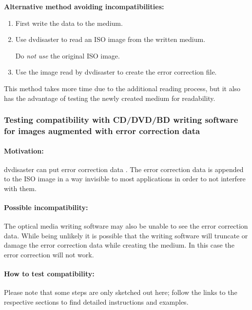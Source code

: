 \newpage

{\bf Alternative method avoiding incompatibilities:}

\begin{enumerate}
\item First write the data to the medium.
\item Use dvdisaster to read an ISO image from the written medium.

Do {\em not use} the original ISO image.
\item Use the  image read by dvdisaster to create the error correction file.
\end{enumerate}

This method takes more time due to the additional reading process, but 
it also has the advantage of testing the newly created medium for readability. 

\newpage
\subsubsection{Testing compatibility with CD/DVD/BD writing software for images augmented with error correction data}
\label{howto-compat-augment}

\paragraph{Motivation:} dvdisaster can put error correction 
data . The error 
correction data is appended to the ISO image in a way invisible to most applications 
in order to not interfere with them.

\paragraph{Possible incompatibility:} The optical media writing software 
may also be unable to see the error correction data. While being unlikely 
it is possible that the writing software will truncate or damage the error 
correction data while creating the medium. In this case the error correction will not work.

\paragraph{How to test compatibility:} Please note that some steps are only sketched out here; follow
the links to the respective sections to find detailed instructions and examples.

